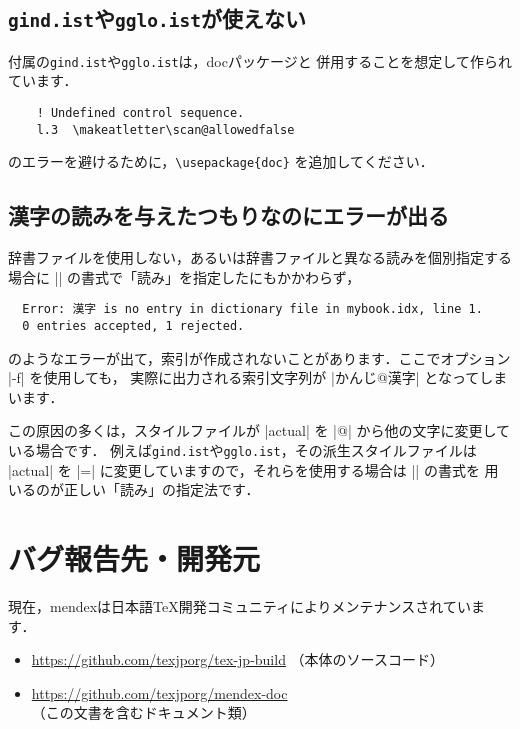 \documentclass[a4paper]{jsarticle}
\newcommand{\SoftName}[1]{\textsf{#1}}
\newcommand{\FileName}[1]{\texttt{#1}}
\begin{document}
\subsection{\FileName{gind.ist}や\FileName{gglo.ist}が使えない}
\LaTeXe 付属の\FileName{gind.ist}や\FileName{gglo.ist}は，\SoftName{doc}パッケージと
併用することを想定して作られています．
\begin{verbatim}
    ! Undefined control sequence.
    l.3  \makeatletter\scan@allowedfalse
\end{verbatim}
のエラーを避けるために，\verb+\usepackage{doc}+ を追加してください．

\subsection{漢字の読みを与えたつもりなのにエラーが出る}
辞書ファイルを使用しない，あるいは辞書ファイルと異なる読みを個別指定する場合に
|| の書式で「読み」を指定したにもかかわらず，
\begin{verbatim}
  Error: 漢字 is no entry in dictionary file in mybook.idx, line 1.
  0 entries accepted, 1 rejected.
\end{verbatim}
のようなエラーが出て，索引が作成されないことがあります．ここでオプション |-f| を使用しても，
実際に出力される索引文字列が |かんじ@漢字| となってしまいます．

この原因の多くは，スタイルファイルが |actual| を |@| から他の文字に変更している場合です．
例えば\FileName{gind.ist}や\FileName{gglo.ist}，その派生スタイルファイルは
|actual| を |=| に変更していますので，それらを使用する場合は || の書式を
用いるのが正しい「読み」の指定法です．

\section{バグ報告先・開発元}
現在，\SoftName{mendex}は日本語\TeX 開発コミュニティによりメンテナンスされています．
\begin{itemize}
  \item \url{https://github.com/texjporg/tex-jp-build} （本体のソースコード）
  \item \url{https://github.com/texjporg/mendex-doc} （この文書を含むドキュメント類）
\end{itemize}
\end{document}
